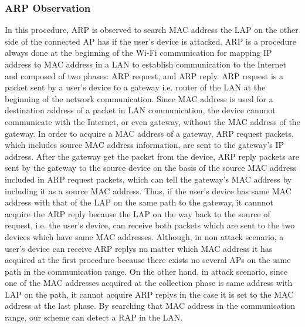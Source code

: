 \documentclass[conference]{IEEEtran}
\begin{document}
\subsubsection{ARP Observation}
In this procedure, ARP is observed to search MAC address the LAP on the other side of the connected AP has if the user's device is attacked.
ARP is a procedure always done at the beginning of the Wi-Fi communication for mapping IP address to MAC address in a LAN to establish communication to the Internet and composed of two phases: ARP request, and ARP reply.
ARP request is a packet sent by a user's device to a gateway i.e. router of the LAN at the beginning of the network communication.
Since MAC address is used for a destination address of a packet in LAN communication, the device cannnot communicate with the Internet, or even gateway, without the MAC address of the gateway.
In order to acquire a MAC address of a gateway, ARP request packets, which includes source MAC address information, are sent to the gateway's IP address. 
After the gateway get the packet from the device, ARP reply packets are sent by the gateway to the source device on the basis of the source MAC address included in ARP request packets, which can tell the gateway's MAC address by including it as a source MAC address.
Thus, if the user's device has same MAC address with that of the LAP on the same path to the gateway, it cannnot acquire the ARP reply because the LAP on the way back to the source of request, i.e. the user's device, can receive both packets which are sent to the two devices which have same MAC addresses.
Although, in non attack scenario, a user's device can receive ARP replys no matter which MAC address it has acquired at the first procedure because there exists no several APs on the same path in the communication range.
On the other hand, in attack scenario, since one of the MAC addresses acquired at the collection phase is same address with LAP on the path, it cannot acquire ARP replys in the case it is set to the MAC address at the last phase.
By searching that MAC address in the communication range, our scheme can detect a RAP in the LAN. 
\end{document}
